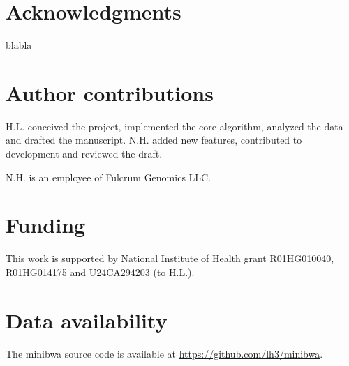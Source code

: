 \documentclass[webpdf,contemporary,large,namedate]{oup-authoring-template}%
\begin{document}
\section*{Acknowledgments}

blabla

\section*{Author contributions}

H.L. conceived the project, implemented the core algorithm, analyzed the data and drafted the manuscript.
N.H. added new features, contributed to development and reviewed the draft.


N.H. is an employee of Fulcrum Genomics LLC.

\section*{Funding}

This work is supported by National Institute of Health grant R01HG010040, R01HG014175 and U24CA294203 (to H.L.).

\section*{Data availability}

The minibwa source code is available at \url{https://github.com/lh3/minibwa}.


{\sffamily\small
}
\end{document}
